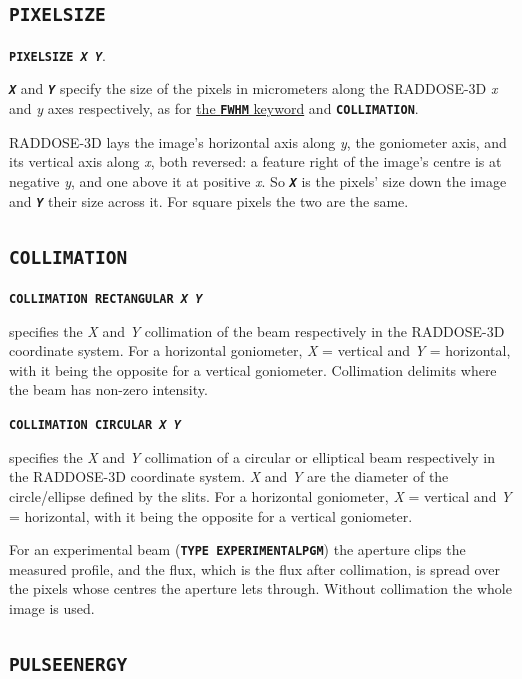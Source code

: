 \documentclass[a4paper]{article}
\newcommand{\Keyword}[1]{\texttt{\textbf{#1}}\xspace}
\begin{document}
\subsection{\Keyword{PIXELSIZE}}
\label{pixelsize}

\noindent \Keyword{PIXELSIZE \textit{X Y}}.

\Keyword{\textit{X}} and \Keyword{\textit{Y}} specify the size of the pixels in micrometers along the RADDOSE-3D \textit{x} and \textit{y} axes respectively, as for \hyperref[beamfwhm]{the \Keyword{FWHM} keyword} and \Keyword{COLLIMATION}.

RADDOSE-3D lays the image's horizontal axis along \textit{y}, the goniometer axis, and its vertical axis along \textit{x}, both reversed: a feature right of the image's centre is at negative \textit{y}, and one above it at positive \textit{x}. So \Keyword{\textit{X}} is the pixels' size down the image and \Keyword{\textit{Y}} their size across it. For square pixels the two are the same.

\subsection{\Keyword{COLLIMATION}}

\noindent \Keyword{COLLIMATION RECTANGULAR \textit{X Y}}

specifies the \textit{X} and \textit{Y} collimation of the beam respectively in the RADDOSE-3D coordinate system. 
For a horizontal goniometer, \textit{X} = vertical and \textit{Y} = horizontal, with it being the opposite for a vertical goniometer.  Collimation delimits where the beam has non-zero intensity.


\noindent \Keyword{COLLIMATION CIRCULAR \textit{X Y}}

specifies the \textit{X} and \textit{Y} collimation of a circular or elliptical beam respectively in the RADDOSE-3D coordinate system. 
\textit{X} and \textit{Y} are the diameter of the circle/ellipse defined by the slits. For a horizontal goniometer, \textit{X} = vertical and \textit{Y} = horizontal, with it being the opposite for a vertical goniometer. 

For an experimental beam (\Keyword{TYPE EXPERIMENTALPGM}) the aperture clips the measured profile, and the flux, which is the flux after collimation, is spread over the pixels whose centres the aperture lets through. Without collimation the whole image is used.

\subsection{\Keyword{PULSEENERGY}}
\label{pulseenergy}
\end{document}
